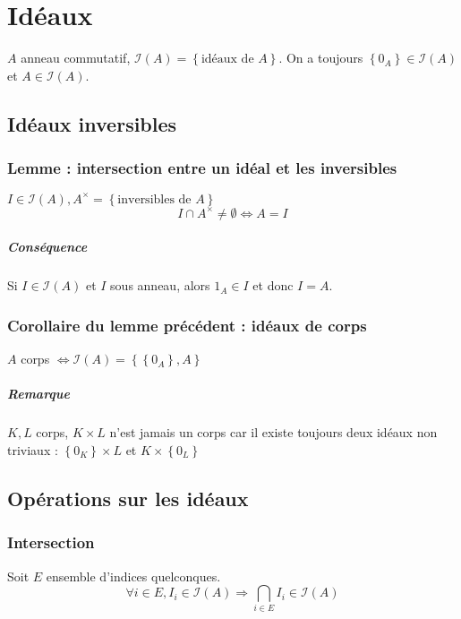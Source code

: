 \documentclass[reqno,a4paper,10pt]{report}
\newcommand{\set}[1]{\left\lbrace #1 \right\rbrace} %
\newcommand{\so}{\Rightarrow}
\begin{document}
\chapter{Idéaux}
$A$ anneau commutatif, $\mathcal{I}(A) = \set{\text{idéaux de }A}$. On a
toujours $\set{0_A} \in \mathcal{I}(A)$ et $A \in \mathcal{I}(A)$.
\section{Idéaux inversibles}
\subsection{Lemme : intersection entre un idéal et les inversibles}
$I \in \mathcal{I}(A), A^\times = \set{\text{inversibles de } A}$
\[I\cap A^\times \neq \emptyset \iff A=I\]

\begin{comment}
  Preuve 22/10/09 p1
\end{comment}

\paragraph{Conséquence} Si $I\in \mathcal{I}(A)$ et $I$ sous anneau, alors $1_A
\in I$ et donc $I=A$.

\subsection{Corollaire du lemme précédent : idéaux de corps}
$A$ corps $\iff \mathcal{I}(A) = \set{\set{0_A}, A}$

\paragraph{Remarque} $K, L$ corps, $K\times L$ n'est jamais un corps car il
existe toujours deux idéaux non triviaux : $\set{0_K}\times L$ et
$K\times \set{0_L}$

\section{Opérations sur les idéaux}
\subsection{Intersection}
Soit $E$ ensemble d'indices quelconques.
\[\forall i \in E, I_i \in \mathcal{I}(A) \so \bigcap_{i\in E} I_i \in
\mathcal{I}(A)\]
\begin{comment}
  Preuve 22/10/09 p2
\end{comment}
\end{document}

